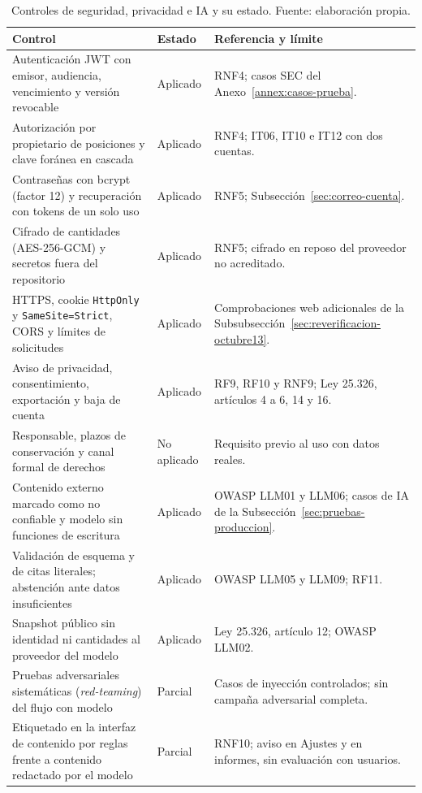 \begin{table}[ht]
\centering\small\renewcommand{\arraystretch}{1.15}
\caption{Controles de seguridad, privacidad e IA y su estado. Fuente: elaboración propia.}\label{tab:controles}
\begin{tabular}{>{\raggedright\arraybackslash}p{5.6cm}>{\raggedright\arraybackslash}p{1.9cm}>{\raggedright\arraybackslash}p{6.1cm}}\hline
\textbf{Control} & \textbf{Estado} & \textbf{Referencia y límite}\\\hline
Autenticación JWT con emisor, audiencia, vencimiento y versión revocable & Aplicado & RNF4; casos SEC del Anexo~\ref{annex:casos-prueba}.\\
Autorización por propietario de posiciones y clave foránea en cascada & Aplicado & RNF4; IT06, IT10 e IT12 con dos cuentas.\\
Contraseñas con bcrypt (factor 12) y recuperación con tokens de un solo uso & Aplicado & RNF5; Subsección~\ref{sec:correo-cuenta}.\\
Cifrado de cantidades (AES-256-GCM) y secretos fuera del repositorio & Aplicado & RNF5; cifrado en reposo del proveedor no acreditado.\\
HTTPS, cookie \texttt{HttpOnly} y \texttt{SameSite=Strict}, CORS y límites de solicitudes & Aplicado & Comprobaciones web adicionales de la Subsubsección~\ref{sec:reverificacion-octubre13}.\\
Aviso de privacidad, consentimiento, exportación y baja de cuenta & Aplicado & RF9, RF10 y RNF9; Ley 25.326, artículos 4 a 6, 14 y 16.\\
Responsable, plazos de conservación y canal formal de derechos & No aplicado & Requisito previo al uso con datos reales.\\
Contenido externo marcado como no confiable y modelo sin funciones de escritura & Aplicado & OWASP LLM01 y LLM06; casos de IA de la Subsección~\ref{sec:pruebas-produccion}.\\
Validación de esquema y de citas literales; abstención ante datos insuficientes & Aplicado & OWASP LLM05 y LLM09; RF11.\\
Snapshot público sin identidad ni cantidades al proveedor del modelo & Aplicado & Ley 25.326, artículo 12; OWASP LLM02.\\
Pruebas adversariales sistemáticas (\textit{red-teaming}) del flujo con modelo & Parcial & Casos de inyección controlados; sin campaña adversarial completa.\\
Etiquetado en la interfaz de contenido por reglas frente a contenido redactado por el modelo & Parcial & RNF10; aviso en Ajustes y en informes, sin evaluación con usuarios.\\

\end{tabular}
\end{table}
